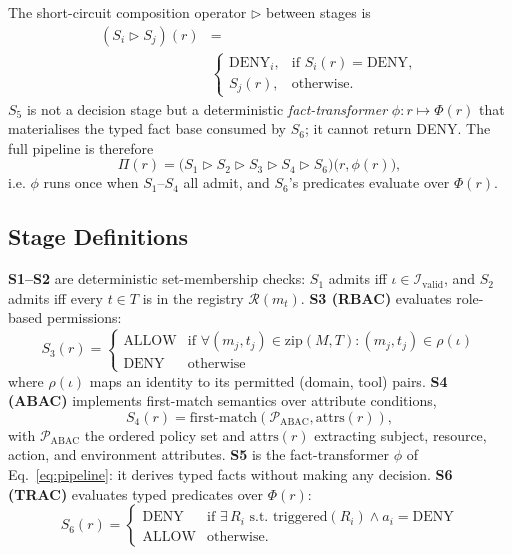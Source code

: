 \documentclass[sigconf,review,anonymous]{acmart}
\begin{document}
The short-circuit composition operator $\rhd$ between stages is
\begin{equation}
\begin{aligned}
(S_i \rhd S_j)(r) &= \\
&\begin{cases}
\text{DENY}_i, & \text{if } S_i(r) = \text{DENY}, \\
S_j(r), & \text{otherwise.}
\end{cases}
\end{aligned}
\label{eq:composition}
\end{equation}
$S_5$ is not a decision stage but a deterministic \emph{fact-transformer} $\phi\!:\!r\!\mapsto\!\Phi(r)$ that materialises the typed fact base consumed by $S_6$; it cannot return DENY. The full pipeline is therefore
\begin{equation}
\Pi(r) = \bigl(S_1 \rhd S_2 \rhd S_3 \rhd S_4 \rhd S_6\bigr)\!\bigl(r,\phi(r)\bigr),
\label{eq:pipeline}
\end{equation}
i.e. $\phi$ runs once when $S_1$--$S_4$ all admit, and $S_6$'s predicates evaluate over $\Phi(r)$.

\subsection{Stage Definitions}
\label{sec:stage_definitions}

\textbf{S1--S2} are deterministic set-membership checks: $S_1$ admits iff $\iota \in \mathcal{I}_{\text{valid}}$, and $S_2$ admits iff every $t\in T$ is in the registry $\mathcal{R}(m_t)$. \textbf{S3 (RBAC)} evaluates role-based permissions:
\begin{equation}
S_3(r) = \begin{cases}
\text{ALLOW} & \text{if } \forall (m_j, t_j) \in \text{zip}(M,T)\!: (m_j, t_j) \in \rho(\iota) \\
\text{DENY} & \text{otherwise}
\end{cases}
\label{eq:rbac}
\end{equation}
where $\rho(\iota)$ maps an identity to its permitted (domain, tool) pairs. \textbf{S4 (ABAC)} implements first-match semantics over attribute conditions,
\begin{equation}
S_4(r) = \text{first-match}(\mathcal{P}_{\text{ABAC}}, \text{attrs}(r)),
\label{eq:abac}
\end{equation}
with $\mathcal{P}_{\text{ABAC}}$ the ordered policy set and $\text{attrs}(r)$ extracting subject, resource, action, and environment attributes. \textbf{S5} is the fact-transformer $\phi$ of Eq.~\ref{eq:pipeline}: it derives typed facts without making any decision. \textbf{S6 (TRAC)} evaluates typed predicates over $\Phi(r)$:
\begin{equation}
S_6(r) = \begin{cases}
\text{DENY} & \text{if } \exists\, R_i \text{ s.t. } \text{triggered}(R_i) \land a_i = \text{DENY} \\
\text{ALLOW} & \text{otherwise.}
\end{cases}
\label{eq:trac}
\end{equation}
\end{document}
